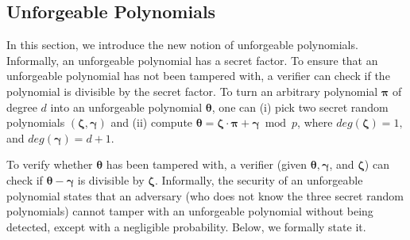 





\vspace{-3mm}

\subsection{Unforgeable Polynomials}

\vspace{-1.5mm}

In this section, we introduce the new notion of unforgeable polynomials. Informally, an unforgeable polynomial has a secret factor. To ensure that an unforgeable polynomial has not been tampered with, a verifier can check if the polynomial is divisible by the secret factor. 
%
To turn an arbitrary polynomial $\bm\pi$ of degree $d$ into an unforgeable polynomial $\bm\theta$, one can (i) pick two secret random polynomials $(\bm\zeta, \bm \gamma)$ and (ii) compute $\bm\theta=\bm\zeta\cdot\bm \pi + \bm \gamma \bmod p$, where  $deg(\bm\zeta)= 1, $ and   $deg(\bm\gamma)= d+1$. 

To verify whether $\bm\theta$ has been tampered with, a verifier (given $\bm\theta, \bm \gamma$, and $\bm\zeta$) can check if $\bm\theta-\bm \gamma$ is divisible by $\bm\zeta$. Informally, the security of an unforgeable polynomial states that an adversary (who does not know the three secret random polynomials) cannot tamper with an unforgeable polynomial without being detected, except with a negligible probability. Below, we formally state it. 

